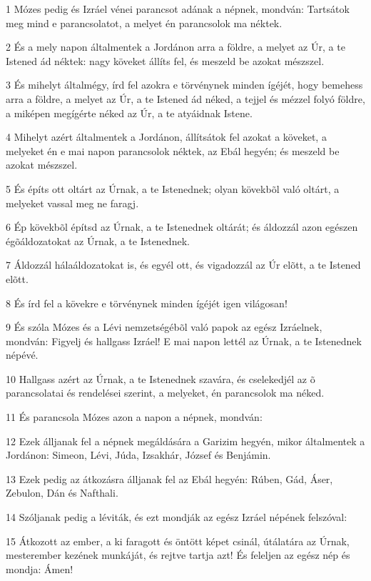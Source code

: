 \par 1 Mózes pedig és Izráel vénei parancsot adának a népnek, mondván: Tartsátok meg mind e parancsolatot, a melyet én parancsolok ma néktek.
\par 2 És a mely napon általmentek a Jordánon arra a földre, a melyet az Úr, a te Istened ád néktek: nagy köveket állíts fel, és meszeld be azokat mészszel.
\par 3 És mihelyt általmégy, írd fel azokra e törvénynek minden ígéjét, hogy bemehess arra a földre, a melyet az Úr, a te Istened ád néked, a tejjel és mézzel folyó földre, a miképen megígérte néked az Úr, a te atyáidnak Istene.
\par 4 Mihelyt azért általmentek a Jordánon, állítsátok fel azokat a köveket, a melyeket én e mai napon parancsolok néktek, az Ebál hegyén; és meszeld be azokat mészszel.
\par 5 És építs ott oltárt az Úrnak, a te Istenednek; olyan kövekbõl való oltárt, a melyeket vassal meg ne faragj.
\par 6 Ép kövekbõl építsd az Úrnak, a te Istenednek oltárát; és áldozzál azon egészen égõáldozatokat az Úrnak, a te Istenednek.
\par 7 Áldozzál hálaáldozatokat is, és egyél ott, és vigadozzál az Úr elõtt, a te Istened elõtt.
\par 8 És írd fel a kövekre e törvénynek minden ígéjét igen világosan!
\par 9 És szóla Mózes és a Lévi nemzetségébõl való papok az egész Izráelnek, mondván: Figyelj és hallgass Izráel! E mai napon lettél az Úrnak, a te Istenednek népévé.
\par 10 Hallgass azért az Úrnak, a te Istenednek szavára, és cselekedjél az õ parancsolatai és rendelései szerint, a melyeket, én parancsolok ma néked.
\par 11 És parancsola Mózes azon a napon a népnek, mondván:
\par 12 Ezek álljanak fel a népnek megáldására a Garizim hegyén, mikor általmentek a Jordánon: Simeon, Lévi, Júda, Izsakhár, József és Benjámin.
\par 13 Ezek pedig az átkozásra álljanak fel az Ebál hegyén: Rúben, Gád, Áser, Zebulon, Dán és Nafthali.
\par 14 Szóljanak pedig a léviták, és ezt mondják az egész Izráel népének felszóval:
\par 15 Átkozott az ember, a ki faragott és öntött képet csinál, útálatára az Úrnak, mesterember kezének munkáját, és rejtve tartja azt! És feleljen az egész nép és mondja: Ámen!
